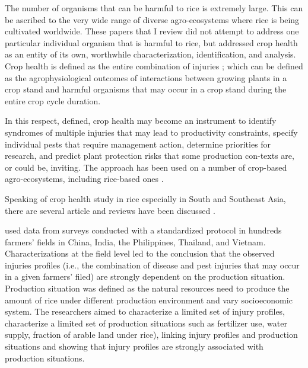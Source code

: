 The number of organisms that can be harmful to rice is extremely large. This can be ascribed to the very wide range of diverse agro-ecosystems where rice is being cultivated worldwide. These papers that I review did not attempt to address one particular individual organism that is harmful to rice, but addressed crop health as an entity of its own, worthwhile characterization, identification, and analysis. Crop health is defined as the entire combination of injuries \citep{Zadok1985}; which can be defined as the agrophysiological outcomes of interactions between growing plants in a crop stand and harmful organisms that may occur in a crop stand during the entire crop cycle duration. 

In this respect, defined, crop health may become an instrument to identify syndromes of multiple injuries that may lead to productivity constraints, specify individual pests that require management action, determine priorities for research, and predict plant protection risks that some production con-texts are, or could be, inviting. The approach has been used on a number of crop-based agro-ecosystems, including rice-based ones \citep{Savary:2006to}.

Speaking of crop health study in rice especially in South and Southeast Asia, there are several article and reviews have been discussed \cite{savary2005multiple, Savary:2006to, Savary:2000vr, reddy2011characterizing, dong2010characterization}. 

\cite{Savary:2000vr} used data from surveys conducted with a standardized protocol in hundreds farmers’ fields in China, India, the Philippines, Thailand, and Vietnam. Characterizations at the field level led to the conclusion that the observed injuries profiles (i.e., the combination of disease and pest injuries that may occur in a given farmers’ filed) are strongly dependent on the production situation. Production situation was defined as the natural resources need to produce the amount of rice under different production environment and vary socioeconomic system. The researchers aimed to characterize a limited set of injury profiles, characterize a limited set of production situations such as fertilizer use, water supply, fraction of arable land under rice), linking injury profiles and production situations and showing that injury profiles are strongly associated with production situations. 

